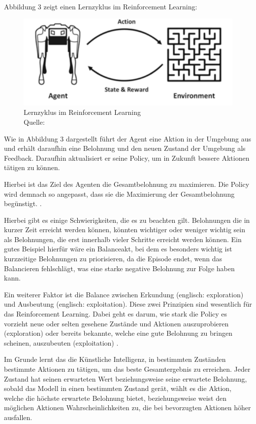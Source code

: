 	Abbildung 3 zeigt einen Lernzyklus im Reinforcement Learning:
\nopagebreak
\begin{figure}[H]
\includegraphics[width=1\textwidth]{Bilder/rl} 
\caption[Lernzyklus im Reinforcement Learning]{Lernzyklus im Reinforcement Learning\\ Quelle: \cite{ris-ala_fundamentals_2023}}
\end{figure}

Wie in Abbildung 3 dargestellt führt der Agent eine Aktion in der Umgebung aus und erhält daraufhin eine Belohnung und den neuen Zustand der Umgebung als Feedback. Daraufhin aktualisiert er seine Policy, um in Zukunft bessere Aktionen tätigen zu können.

Hierbei ist das Ziel des Agenten die Gesamtbelohnung zu maximieren. Die Policy wird demnach so angepasst, dass sie die Maximierung der Gesamtbelohnung begünstigt. \cite[Seite 12f]{ris-ala_fundamentals_2023}.

Hierbei gibt es einige Schwierigkeiten, die es zu beachten gilt. Belohnungen die in kurzer Zeit erreicht werden können, könnten wichtiger oder weniger wichtig sein als Belohnungen, die erst innerhalb vieler Schritte erreicht werden können. Ein gutes Beispiel hierfür wäre ein Balanceakt, bei dem es besonders wichtig ist kurzzeitige Belohnungen zu priorisieren, da die Episode endet, wenn das Balancieren fehlschlägt, was eine starke negative Belohnung zur Folge haben kann.

Ein weiterer Faktor ist die Balance zwischen Erkundung (englisch: exploration) und Ausbeutung (englisch: exploitation). Diese zwei Prinzipien sind wesentlich für das Reinforcement Learning. Dabei geht es darum, wie stark die Policy es vorzieht neue oder selten gesehene Zustände und Aktionen auszuprobieren (exploration) oder bereits bekannte, welche eine gute Belohnung zu bringen scheinen, auszubeuten (exploitation) \cite[Seite 13]{ris-ala_fundamentals_2023}.

Im Grunde lernt das die Künstliche Intelligenz, in bestimmten Zuständen bestimmte Aktionen zu tätigen, um das beste Gesamtergebnis zu erreichen. Jeder Zustand hat seinen erwarteten Wert beziehungsweise seine erwartete Belohnung, sobald das Modell in einen bestimmten Zustand gerät, wählt es die Aktion, welche die höchste erwartete Belohnung bietet, beziehungsweise weist den möglichen Aktionen Wahrscheinlichkeiten zu, die bei bevorzugten Aktionen höher ausfallen.\\

